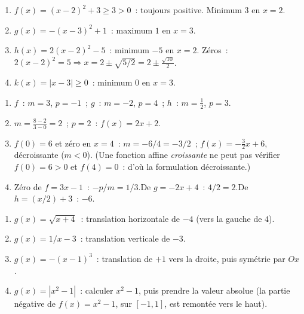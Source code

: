 
\begin{enumerate}
  \item $f(x)=(x-2)^2+3\geq3>0$~: toujours positive. Minimum $3$ en $x=2$.
  \item $g(x)=-(x-3)^2+1$~: maximum $1$ en $x=3$.
  \item $h(x)=2(x-2)^2-5$~: minimum $-5$ en $x=2$.
        Z\'eros~: $2(x-2)^2=5\Rightarrow x=2\pm\sqrt{5/2}=2\pm\frac{\sqrt{10}}{2}$.
  \item $k(x)=|x-3|\geq0$~: minimum $0$ en $x=3$.
\end{enumerate}


\begin{enumerate}
  \item $f$~: $m=3$, $p=-1$~; $g$~: $m=-2$, $p=4$~; $h$~: $m=\frac{1}{2}$, $p=3$.
  \item $m=\frac{8-2}{3-0}=2$~; $p=2$~: $f(x)=2x+2$.
  \item $f(0)=6$ et z\'ero en $x=4$~: $m=-6/4=-3/2$~; $f(x)=-\frac{3}{2}x+6$, d\'ecroissante ($m<0$).
        (Une fonction affine \emph{croissante} ne peut pas v\'erifier $f(0)=6>0$ et $f(4)=0$~: d'o\`u la formulation \og d\'ecroissante\fg.)
  \item Z\'ero de $f=3x-1$~: $-p/m=1/3$.\checkmark\quad De $g=-2x+4$~: $4/2=2$.\checkmark\quad De $h=(x/2)+3$~: $-6$.
\end{enumerate}


\begin{enumerate}
  \item $g(x)=\sqrt{x+4}$~: translation horizontale de $-4$ (vers la gauche de $4$).
  \item $g(x)=1/x-3$~: translation verticale de $-3$.
  \item $g(x)=-(x-1)^3$~: translation de $+1$ vers la droite, puis sym\'etrie par $Ox$.
  \item $g(x)=|x^2-1|$~: calculer $x^2-1$, puis prendre la valeur absolue
        (la partie n\'egative de $f(x)=x^2-1$, sur $[-1,1]$, est remont\'ee vers le haut).
\end{enumerate}


